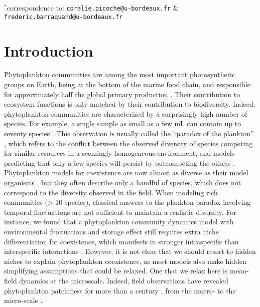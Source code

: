 \documentclass[12pt,english]{article}
\begin{document}
$^{*}$correspondence to: \verb|coralie.picoche@u-bordeaux.fr|
\&\\ \hspace*{10.4em}\verb|frederic.barraquand@u-bordeaux.fr|

\clearpage{}

\section*{Introduction}

Phytoplankton communities are among the most important photosynthetic
groups on Earth, being at the bottom of the marine food chain, and
responsible for approximately half the global primary production \citep{field_primary_1998}.
Their contribution to ecosystem functions is only matched by their
contribution to biodiversity. Indeed, phytoplankton communities are
characterized by a surprisingly high number of species. For example,
a single sample as small as a few mL can contain up to seventy species
\citep{REPHY_db,widdicombe_2021}. This observation is usually called
the ``paradox of the plankton'' \citep{hutchinson_paradox_1961},
which refers to the conflict between the observed diversity of species
competing for similar resources in a seemingly homogeneous environment,
and models predicting that only a few species will persist by outcompeting
the others \citep{macarthur_competition_1964,huisman_biodiversity_1999,schippers_does_2001}.
Phytoplankton models for coexistence are now almost as diverse as
their model organisms \citep{record_paradox_2014}, but they often
describe only a handful of species, which does not correspond to the
diversity observed in the field. When modeling rich communities (\textgreater{}
10 species), classical answers to the plankton paradox involving temporal
fluctuations \citep[e.g.,][]{li_effects_2016,chesson_updates_2018}
are not sufficient to maintain a realistic diversity. For instance,
we found that a phytoplankton community dynamics model with environmental
fluctuations and storage effect still requires extra niche differentiation
for coexistence, which manifests in stronger intraspecific than interspecific
interactions \citep{picoche_how_2019}. However, it is not clear that
we should resort to hidden niches to explain phytoplankton coexistence,
as most models also make hidden simplifying assumptions that could
be relaxed. One that we relax here is mean-field dynamics at the microscale.
Indeed, field observations have revealed phytoplankton patchiness
for more than a century \citep{bainbridge_size_1957,stocker_marine_2012},
from the macro- to the micro-scale \citep{leonard_interannual_2001,doubell_high-resolution_2006,font-munoz_advection_2017}.
\end{document}
